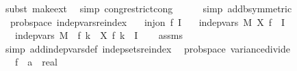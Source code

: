 \begin{isabellebody}
\ {\isacharparenleft}{\kern0pt}subst\ make{\isacharunderscore}{\kern0pt}ext{\isacharparenright}{\kern0pt}\ \isamarkupfalse%
\ {\isacharparenleft}{\kern0pt}simp\ cong{\isacharcolon}{\kern0pt}restrict{\isacharunderscore}{\kern0pt}cong{\isacharparenright}{\kern0pt}\isanewline
\ \ \ \ \isamarkupfalse%
\ {\isacharparenleft}{\kern0pt}simp\ add{\isacharcolon}{\kern0pt}b{\isacharbrackleft}{\kern0pt}symmetric{\isacharbrackright}{\kern0pt}{\isacharparenright}{\kern0pt}\isanewline
{}\isamarkupfalse%
%
\endisatagproof
{\isafoldproof}%
%
\isadelimproof
\isanewline
%
\endisadelimproof
\isanewline
{}\isamarkupfalse%
\ {\isacharparenleft}{\kern0pt}\ prob{\isacharunderscore}{\kern0pt}space{\isacharparenright}{\kern0pt}\ indep{\isacharunderscore}{\kern0pt}vars{\isacharunderscore}{\kern0pt}reindex{\isacharcolon}{\kern0pt}\isanewline
\ \ \ {\isachardoublequoteopen}inj{\isacharunderscore}{\kern0pt}on\ f\ I{\isachardoublequoteclose}\isanewline
\ \ \ {\isachardoublequoteopen}indep{\isacharunderscore}{\kern0pt}vars\ M{\isacharprime}{\kern0pt}\ X{\isacharprime}{\kern0pt}\ {\isacharparenleft}{\kern0pt}f\ {\isacharbackquote}{\kern0pt}\ I{\isacharparenright}{\kern0pt}{\isachardoublequoteclose}\isanewline
\ \ \ {\isachardoublequoteopen}indep{\isacharunderscore}{\kern0pt}vars\ {\isacharparenleft}{\kern0pt}M{\isacharprime}{\kern0pt}\ {\isasymcirc}\ f{\isacharparenright}{\kern0pt}\ {\isacharparenleft}{\kern0pt}{\isasymlambda}k\ {\isasymomega}{\isachardot}{\kern0pt}\ X{\isacharprime}{\kern0pt}\ {\isacharparenleft}{\kern0pt}f\ k{\isacharparenright}{\kern0pt}\ {\isasymomega}{\isacharparenright}{\kern0pt}\ I{\isachardoublequoteclose}\isanewline
%
\isadelimproof
\ \ %
\endisadelimproof
%
\isatagproof
{}\isamarkupfalse%
\ assms\ \isamarkupfalse%
\ {\isacharparenleft}{\kern0pt}simp\ add{\isacharcolon}{\kern0pt}indep{\isacharunderscore}{\kern0pt}vars{\isacharunderscore}{\kern0pt}def{}\ indep{\isacharunderscore}{\kern0pt}sets{\isacharunderscore}{\kern0pt}reindex{\isacharparenright}{\kern0pt}%
\endisatagproof
{\isafoldproof}%
%
\isadelimproof
\isanewline
%
\endisadelimproof
\isanewline
{}\isamarkupfalse%
\ {\isacharparenleft}{\kern0pt}\ prob{\isacharunderscore}{\kern0pt}space{\isacharparenright}{\kern0pt}\ variance{\isacharunderscore}{\kern0pt}divide{\isacharcolon}{\kern0pt}\isanewline
\ \ \ f\ {\isacharcolon}{\kern0pt}{\isacharcolon}{\kern0pt}\ {\isachardoublequoteopen}{\isacharprime}{\kern0pt}a\ {\isasymRightarrow}\ real{\isachardoublequoteclose}\isanewline

\end{isabellebody}
